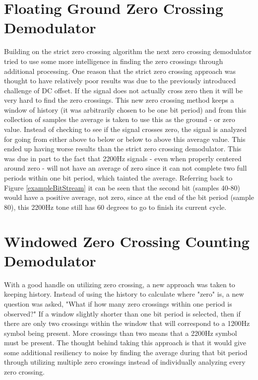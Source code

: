 \section{Floating Ground Zero Crossing Demodulator}
Building on the strict zero crossing algorithm the next zero crossing demodulator tried to use some more intelligence in finding the zero crossings through additional processing. One reason that the strict zero crossing approach was thought to have relatively poor results was due to the previously introduced challenge of DC offset. If the signal does not actually cross zero then it will be very hard to find the zero crossings. This new zero crossing method keeps a window of history (it was arbitrarily chosen to be one bit period) and from this collection of samples the average is taken to use this as the ground - or zero value. Instead of checking to see if the signal crosses zero, the signal is analyzed for going from either above to below or below to above this average value. This ended up having worse results than the strict zero crossing demodulator. This was due in part to the fact that 2200Hz signals - even when properly centered around zero - will not have an average of zero since it can not complete two full periods within one bit period, which tainted the average. Referring back to Figure \ref{exampleBitStream} it can be seen that the second bit (samples 40-80) would have a positive average, not zero, since at the end of the bit period (sample 80), this 2200Hz tone still has 60 degrees to go to finish its current cycle. 

\section{Windowed Zero Crossing Counting Demodulator}
With a good handle on utilizing zero crossing, a new approach was taken to keeping history. Instead of using the history to calculate where "zero" is, a new question was asked, "What if how many zero crossings within one period is observed?" If a window slightly shorter than one bit period is selected, then if there are only two crossings within the window that will correspond to a 1200Hz symbol being present. More crossings than two means that a 2200Hz symbol must be present. The thought behind taking this approach is that it would give some additional resiliency to noise by finding the average during that bit period through utilizing multiple zero crossings instead of individually analyzing every zero crossing. 

